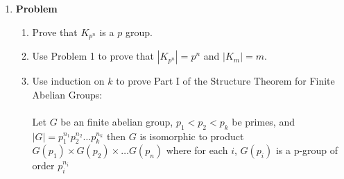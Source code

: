 \documentclass[12pt]{amsart}
\newcommand{\benu}{\begin{enumerate}}
\newcommand{\eenu}{\end{enumerate}}
\theoremstyle{definition}
\newcommand{\itep}{\item {\bfseries Problem}\ }
\begin{document}
\newpage

\begin{enumerate}[resume=p]
\itep
\benu
\item Prove that $K_{p^n}$ is a $p$ group.
\item Use Problem 1 to prove that $|K_{p^n}|=p^n$ and $|K_m|=m$.
\item Use induction on $k$ to prove Part I of the Structure Theorem for Finite Abelian Groups:
\\\\ Let $G$ be an finite abelian group, $p_1<p_2<p_k$ be primes, and $|G|=p_1^{n_1}p_2^{n_2}\dots p_k^{n_k}$ then $G$ is isomorphic to product $G(p_1)\times G(p_2)\times \dots G(p_n)$ where for each $i$, $G(p_i)$ is a p-group of order $p_i^{n_i}$

\eenu
\end{enumerate}


\newpage

\end{document}
